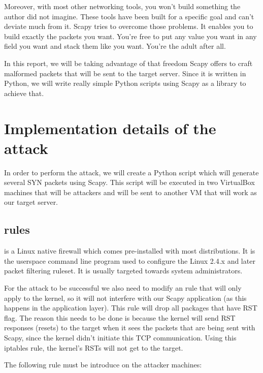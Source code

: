 \documentclass[11pt]{article}
\begin{document}
Moreover, with most other networking tools, you won’t build something the author did not imagine. These tools have been built for a specific goal and can’t deviate much from it. Scapy tries to overcome those problems. It enables you to build exactly the packets you want. You’re free to put any value you want in any field you want and stack them like you want. You’re the adult after all.\vspace{5mm}

In this report, we will be taking advantage of that freedom Scapy offers to craft malformed packets that will be sent to the target server. Since it is written in Python, we will write really simple Python scripts using Scapy as a library to achieve that.
\clearpage

\section{Implementation details of the attack}
In order to perform the attack, we will create a Python script which will generate several SYN packets using Scapy. This script will be executed in two VirtualBox machines that will be attackers and will be sent to another VM that will work as our target server.\vspace{5mm}

\subsection{\textbf{\texttt{}} rules}
\texttt{} is a Linux native firewall which comes pre-installed with most distributions. It is the userspace command line program used to configure the Linux 2.4.x and later packet filtering ruleset. It is usually targeted towards system administrators.\vspace{5mm}

For the attack to be successful we also need to modify an \texttt{} rule that will only apply to the kernel, so it will not interfere with our Scapy application (as this happens in the application layer). This rule will drop all packages that have RST flag. The reason this needs to be done is because the kernel will send RST responses (resets) to the target when it sees the packets that are being sent with Scapy, since the kernel didn’t initiate this TCP communication. Using this iptables rule, the kernel’s RSTs will not get to the target.\vspace{5mm}

The following rule must be introduce on the attacker machines:\vspace{5mm}
\end{document}
